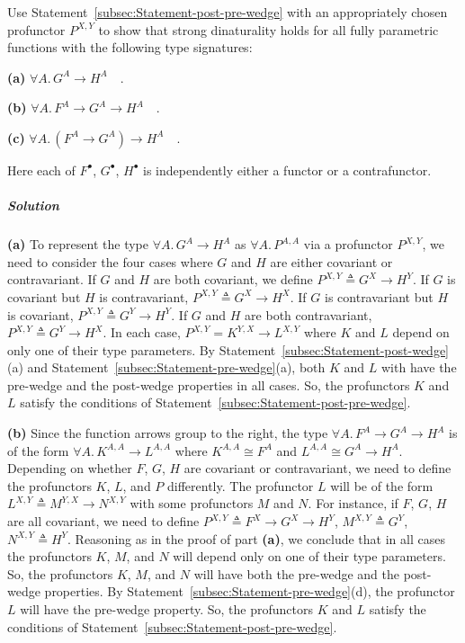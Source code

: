 Use Statement~\ref{subsec:Statement-post-pre-wedge} with an appropriately
chosen profunctor $P^{X,Y}$ to show that strong dinaturality holds
for all fully parametric functions with the following type signatures:

\textbf{(a)} $\forall A.\,G^{A}\rightarrow H^{A}\quad.$

\textbf{(b)} $\forall A.\,F^{A}\rightarrow G^{A}\rightarrow H^{A}\quad.$

\textbf{(c)} $\forall A.\,(F^{A}\rightarrow G^{A})\rightarrow H^{A}\quad.$

Here each of $F^{\bullet}$, $G^{\bullet}$, $H^{\bullet}$ is independently
either a functor or a contrafunctor. 

\subparagraph{Solution}

\textbf{(a)} To represent the type $\forall A.\,G^{A}\rightarrow H^{A}$
as $\forall A.\,P^{A,A}$ via a profunctor $P^{X,Y}$, we need to
consider the four cases where $G$ and $H$ are either covariant or
contravariant. If $G$ and $H$ are both covariant, we define $P^{X,Y}\triangleq G^{X}\rightarrow H^{Y}$.
If $G$ is covariant but $H$ is contravariant, $P^{X,Y}\triangleq G^{X}\rightarrow H^{X}$.
If $G$ is contravariant but $H$ is covariant, $P^{X,Y}\triangleq G^{Y}\rightarrow H^{Y}$.
If $G$ and $H$ are both contravariant, $P^{X,Y}\triangleq G^{Y}\rightarrow H^{X}$.
In each case, $P^{X,Y}=K^{Y,X}\rightarrow L^{X,Y}$ where $K$ and
$L$ depend on only one of their type parameters. By Statement~\ref{subsec:Statement-post-wedge}(a)
and Statement~\ref{subsec:Statement-pre-wedge}(a), both $K$ and
$L$ with have the pre-wedge and the post-wedge properties in all
cases. So, the profunctors $K$ and $L$ satisfy the conditions of
Statement~\ref{subsec:Statement-post-pre-wedge}.

\textbf{(b)} Since the function arrows group to the right, the type
$\forall A.\,F^{A}\rightarrow G^{A}\rightarrow H^{A}$ is of the form
$\forall A.\,K^{A,A}\rightarrow L^{A,A}$ where $K^{A,A}\cong F^{A}$
and $L^{A,A}\cong G^{A}\rightarrow H^{A}$. Depending on whether $F$,
$G$, $H$ are covariant or contravariant, we need to define the profunctors
$K$, $L$, and $P$ differently. The profunctor $L$ will be of the
form $L^{X,Y}\triangleq M^{Y,X}\rightarrow N^{X,Y}$ with some profunctors
$M$ and $N$. For instance, if $F$, $G$, $H$ are all covariant,
we need to define $P^{X,Y}\triangleq F^{X}\rightarrow G^{X}\rightarrow H^{Y}$,
$M^{X,Y}\triangleq G^{Y}$, $N^{X,Y}\triangleq H^{Y}$. Reasoning
as in the proof of part \textbf{(a)}, we conclude that in all cases
the profunctors $K$, $M$, and $N$ will depend only on one of their
type parameters. So, the profunctors $K$, $M$, and $N$ will have
both the pre-wedge and the post-wedge properties. By Statement~\ref{subsec:Statement-pre-wedge}(d),
the profunctor $L$ will have the pre-wedge property. So, the profunctors
$K$ and $L$ satisfy the conditions of Statement~\ref{subsec:Statement-post-pre-wedge}.

